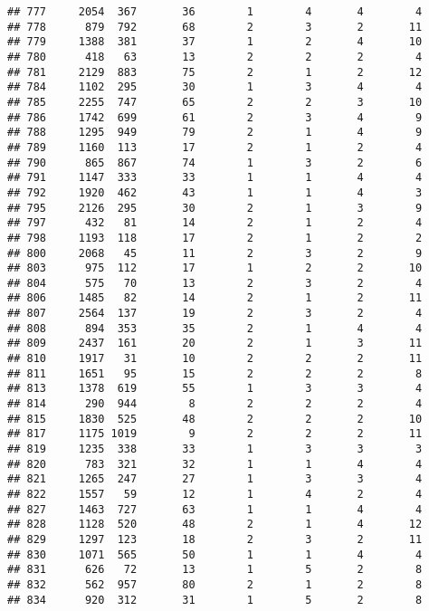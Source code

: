 \documentclass[]{article}
\begin{document}
\begin{verbatim}
## 777     2054  367       36        1        4       4        4
## 778      879  792       68        2        3       2       11
## 779     1388  381       37        1        2       4       10
## 780      418   63       13        2        2       2        4
## 781     2129  883       75        2        1       2       12
## 784     1102  295       30        1        3       4        4
## 785     2255  747       65        2        2       3       10
## 786     1742  699       61        2        3       4        9
## 788     1295  949       79        2        1       4        9
## 789     1160  113       17        2        1       2        4
## 790      865  867       74        1        3       2        6
## 791     1147  333       33        1        1       4        4
## 792     1920  462       43        1        1       4        3
## 795     2126  295       30        2        1       3        9
## 797      432   81       14        2        1       2        4
## 798     1193  118       17        2        1       2        2
## 800     2068   45       11        2        3       2        9
## 803      975  112       17        1        2       2       10
## 804      575   70       13        2        3       2        4
## 806     1485   82       14        2        1       2       11
## 807     2564  137       19        2        3       2        4
## 808      894  353       35        2        1       4        4
## 809     2437  161       20        2        1       3       11
## 810     1917   31       10        2        2       2       11
## 811     1651   95       15        2        2       2        8
## 813     1378  619       55        1        3       3        4
## 814      290  944        8        2        2       2        4
## 815     1830  525       48        2        2       2       10
## 817     1175 1019        9        2        2       2       11
## 819     1235  338       33        1        3       3        3
## 820      783  321       32        1        1       4        4
## 821     1265  247       27        1        3       3        4
## 822     1557   59       12        1        4       2        4
## 827     1463  727       63        1        1       4        4
## 828     1128  520       48        2        1       4       12
## 829     1297  123       18        2        3       2       11
## 830     1071  565       50        1        1       4        4
## 831      626   72       13        1        5       2        8
## 832      562  957       80        2        1       2        8
## 834      920  312       31        1        5       2        8

\end{verbatim}
\end{document}
